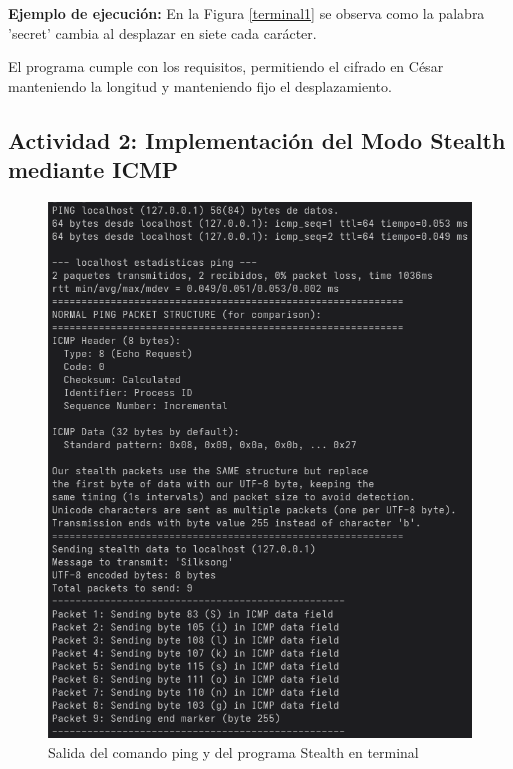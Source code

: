\documentclass[letter,12pt]{article}
\begin{document}
\textbf{Ejemplo de ejecución:} En la Figura \ref{terminal1} se observa como la palabra 'secret' cambia al desplazar en siete cada carácter.

El programa cumple con los requisitos, permitiendo el cifrado en César manteniendo la longitud y manteniendo fijo el desplazamiento.

\subsection{Actividad 2: Implementación del Modo Stealth mediante ICMP}
\begin{figure}
    \centering
    \includegraphics[width=1\linewidth]{actividades/Captura desde 2025-09-04 22-35-30.png}
    \caption{Salida del comando ping y del programa Stealth en terminal}
    \label{fig:terminal2}
\end{figure}
\end{document}
